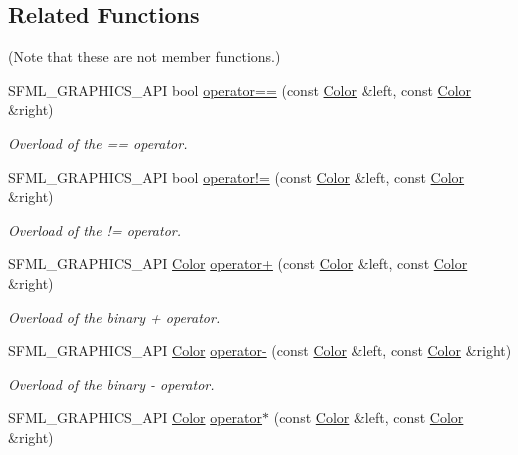 \subsection*{Related Functions}
(Note that these are not member functions.) \begin{DoxyCompactItemize}
\item 
S\+F\+M\+L\+\_\+\+G\+R\+A\+P\+H\+I\+C\+S\+\_\+\+A\+PI bool \hyperlink{classsf_1_1_color_a7498d4670c7655e8d4d91ef49cc6064e}{operator==} (const \hyperlink{classsf_1_1_color}{Color} \&left, const \hyperlink{classsf_1_1_color}{Color} \&right)
\begin{DoxyCompactList}\small\item\em Overload of the == operator. \end{DoxyCompactList}\item 
S\+F\+M\+L\+\_\+\+G\+R\+A\+P\+H\+I\+C\+S\+\_\+\+A\+PI bool \hyperlink{classsf_1_1_color_a5d6501b7dd05f481b79f7163899f1d92}{operator!=} (const \hyperlink{classsf_1_1_color}{Color} \&left, const \hyperlink{classsf_1_1_color}{Color} \&right)
\begin{DoxyCompactList}\small\item\em Overload of the != operator. \end{DoxyCompactList}\item 
S\+F\+M\+L\+\_\+\+G\+R\+A\+P\+H\+I\+C\+S\+\_\+\+A\+PI \hyperlink{classsf_1_1_color}{Color} \hyperlink{classsf_1_1_color_a90e79ecc276114cda519a88119ac645b}{operator+} (const \hyperlink{classsf_1_1_color}{Color} \&left, const \hyperlink{classsf_1_1_color}{Color} \&right)
\begin{DoxyCompactList}\small\item\em Overload of the binary + operator. \end{DoxyCompactList}\item 
S\+F\+M\+L\+\_\+\+G\+R\+A\+P\+H\+I\+C\+S\+\_\+\+A\+PI \hyperlink{classsf_1_1_color}{Color} \hyperlink{classsf_1_1_color_a6d9047ddbcec2bbab8519d93300bb2aa}{operator-\/} (const \hyperlink{classsf_1_1_color}{Color} \&left, const \hyperlink{classsf_1_1_color}{Color} \&right)
\begin{DoxyCompactList}\small\item\em Overload of the binary -\/ operator. \end{DoxyCompactList}\item 
S\+F\+M\+L\+\_\+\+G\+R\+A\+P\+H\+I\+C\+S\+\_\+\+A\+PI \hyperlink{classsf_1_1_color}{Color} \hyperlink{classsf_1_1_color_aa9de267d831b4ec8ba65b627e51d50c3}{operator$\ast$} (const \hyperlink{classsf_1_1_color}{Color} \&left, const \hyperlink{classsf_1_1_color}{Color} \&right)

\end{DoxyCompactItemize}
